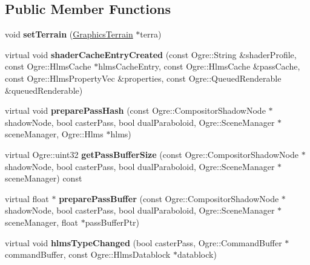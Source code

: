 \subsection*{Public Member Functions}
\begin{DoxyCompactItemize}
\item 
\mbox{\label{class_hlms_pbs_terrain_shadows_abc0156c34287dc229fc6bcd5dd926042}} 
void {\bfseries set\+Terrain} (\hyperlink{class_graphics_terrain}{Graphics\+Terrain} $\ast$terra)
\item 
\mbox{\label{class_hlms_pbs_terrain_shadows_a5d6c59561dd58544669c41271f96673b}} 
virtual void {\bfseries shader\+Cache\+Entry\+Created} (const Ogre\+::\+String \&shader\+Profile, const Ogre\+::\+Hlms\+Cache $\ast$hlms\+Cache\+Entry, const Ogre\+::\+Hlms\+Cache \&pass\+Cache, const Ogre\+::\+Hlms\+Property\+Vec \&properties, const Ogre\+::\+Queued\+Renderable \&queued\+Renderable)
\item 
\mbox{\label{class_hlms_pbs_terrain_shadows_ad8aab96d71ac61b3774d6b454455cf5c}} 
virtual void {\bfseries prepare\+Pass\+Hash} (const Ogre\+::\+Compositor\+Shadow\+Node $\ast$shadow\+Node, bool caster\+Pass, bool dual\+Paraboloid, Ogre\+::\+Scene\+Manager $\ast$scene\+Manager, Ogre\+::\+Hlms $\ast$hlms)
\item 
\mbox{\label{class_hlms_pbs_terrain_shadows_a71a669419504ad94fd31213ae547224f}} 
virtual Ogre\+::uint32 {\bfseries get\+Pass\+Buffer\+Size} (const Ogre\+::\+Compositor\+Shadow\+Node $\ast$shadow\+Node, bool caster\+Pass, bool dual\+Paraboloid, Ogre\+::\+Scene\+Manager $\ast$scene\+Manager) const
\item 
\mbox{\label{class_hlms_pbs_terrain_shadows_ad963e7633a906fd8b8ad4963a08f4770}} 
virtual float $\ast$ {\bfseries prepare\+Pass\+Buffer} (const Ogre\+::\+Compositor\+Shadow\+Node $\ast$shadow\+Node, bool caster\+Pass, bool dual\+Paraboloid, Ogre\+::\+Scene\+Manager $\ast$scene\+Manager, float $\ast$pass\+Buffer\+Ptr)
\item 
\mbox{\label{class_hlms_pbs_terrain_shadows_aac00263a92c1b2ba60e10b87896f99cd}} 
virtual void {\bfseries hlms\+Type\+Changed} (bool caster\+Pass, Ogre\+::\+Command\+Buffer $\ast$command\+Buffer, const Ogre\+::\+Hlms\+Datablock $\ast$datablock)
\end{DoxyCompactItemize}
